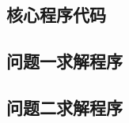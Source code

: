 \begin{appendices}
\renewcommand{\thesubsection}{\Alph{section}.\arabic{subsection}}  %

\section{核心程序代码}

%

\subsection{问题一求解程序}


\subsection{问题二求解程序}

\end{appendices}
